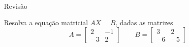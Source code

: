 
\begin{exercicios}{Revisão}

    \begin{exercicio}
        Resolva a equação  matricial $AX = B$, dadas as matrizes
        \[A = \left[\begin{array}{rr}
        2 & -1 \\
        -3 &  2
        \end{array} \right]	
        \qquad
        B = \left[\begin{array}{rr}
        3 &  2 \\
        -6 & -5
        \end{array} \right]	\]
    \end{exercicio}
    
\end{exercicios}

